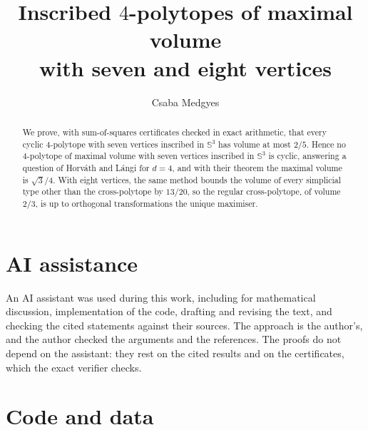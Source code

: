 \documentclass[11pt,reqno]{amsart}
\title[Inscribed $4$-polytopes with seven and eight vertices]
      {Inscribed $4$-polytopes of maximal volume\\
       with seven and eight vertices}
\author{Csaba Medgyes}
\newcounter{artifact}
\theoremstyle{definition}
\begin{document}
\begin{abstract}
  We prove, with sum-of-squares certificates checked in exact arithmetic,
  that every cyclic $4$-polytope with seven vertices inscribed in
  $\mathbb{S}^{3}$ has volume at most $2/5$. Hence no $4$-polytope of maximal
  volume with seven vertices inscribed in $\mathbb{S}^{3}$ is cyclic, answering
  a question of Horv\'ath and L\'angi for $d = 4$, and with their theorem the
  maximal volume is $\sqrt{3}/4$. With eight vertices, the same method bounds
  the volume of every simplicial type other than the cross-polytope by
  $13/20$, so the regular cross-polytope, of volume $2/3$, is up to
  orthogonal transformations the unique maximiser.
\end{abstract}

\maketitle







\section*{AI assistance}

An AI assistant was used during this work, including for mathematical
discussion, implementation of the code, drafting and revising the text, and
checking the cited statements against their sources. The approach is the
author's, and the author checked the arguments and the references. The proofs
do not depend on the assistant: they rest on the cited results and on the
certificates, which the exact verifier checks.

\section*{Code and data}
\label{sec:artifacts}
\end{document}
